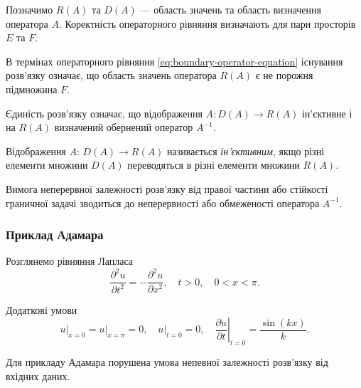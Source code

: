 Позначимо $R(A)$ та $D(A)$ --- область значень та область визначення оператора $A$. Коректність операторного рівняння визначають для пари просторів $E$ та $F$. \medskip

\begin{proposition}
    В термінах операторного рівняння \eqref{eq:boundary-operator-equation} існування розв'язку означає, що область значень оператора $R(A)$ є не порожня підмножина $F$.
\end{proposition}

\begin{proposition}
    Єдиність розв'язку означає, що відображення $A: D(A) \to R(A)$ ін'єктивне і на $R(A)$ визначений обернений оператор $A^{-1}$.
\end{proposition}

\begin{definition}
    Відображення $A$: \allowbreak $D(A) \to R(A)$ називається \textit{ін'єктивним}, якщо різні елементи множини $D(A)$ переводяться в різні елементи множини $R(A)$.    
\end{definition}

\begin{proposition}
    Вимога неперервної залежності розв'язку від правої частини або стійкості граничної задачі зводиться до неперервності або обмеженості оператора $A^{-1}$.
\end{proposition}

\subsubsection{Приклад Адамара}

\begin{example}
    Розглянемо рівняння Лапласа
    \begin{equation}
        \frac{\partial^2 u}{\partial t^2} = - \frac{\partial^2 u}{\partial x^2}, \quad t > 0, \quad 0 < x < \pi.
    \end{equation}

    Додаткові умови
    \begin{equation}
        \left. u \right|_{x = 0} = \left. u \right|_{x = \pi} = 0, \quad \left. u \right|_{t = 0} = 0, \quad \left. \frac{\partial u}{\partial t} \right|_{t = 0} = \frac{\sin (k x)}{k}.
    \end{equation}
\end{example}

\begin{proposition}
    Для прикладу Адамара порушена умова непевної залежності роз\-в'яз\-ку від вхідних даних.
\end{proposition}

